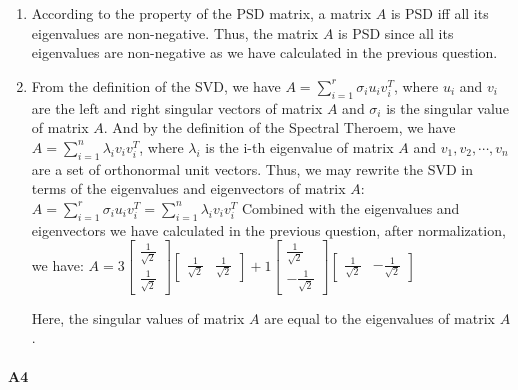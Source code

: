 \documentclass[11pt]{article}
\begin{document}
{{\begin{enumerate}
            \item According to the property of the PSD matrix, a matrix $A$ is PSD iff all its eigenvalues are non-negative. 
            Thus, the matrix $A$ is PSD since all its eigenvalues are non-negative as we have calculated in the previous question.
            \item From the definition of the SVD, we have $A=\sum_{i=1}^r\sigma_iu_iv_i^T$, where $u_i$ and $v_i$ are the left and right singular vectors of matrix $A$ and $\sigma_i$ is the singular value of matrix $A$.
            And by the definition of the Spectral Theroem, we have $A=\sum_{i=1}^n\lambda_iv_iv_i^T$, where $\lambda_i$ is the i-th eigenvalue of matrix $A$ and $v_1, v_2, \cdots, v_n$ are a set of orthonormal unit vectors.
            Thus, we may rewrite the SVD in terms of the eigenvalues and eigenvectors of matrix $A$:
            $
                A = \sum_{i=1}^r\sigma_iu_iv_i^T = \sum_{i=1}^n\lambda_iv_iv_i^T
            $
            Combined with the eigenvalues and eigenvectors we have calculated in the previous question, after normalization, we have:
            $
                A = 3\begin{bmatrix}
                    \frac{1}{\sqrt{2}}\\\frac{1}{\sqrt{2}}
                \end{bmatrix}
                \begin{bmatrix}
                \frac{1}{\sqrt{2}} & \frac{1}{\sqrt{2}}
                \end{bmatrix} + 1\begin{bmatrix}
                    \frac{1}{\sqrt{2}}\\-\frac{1}{\sqrt{2}}
                \end{bmatrix}
                \begin{bmatrix}
                    \frac{1}{\sqrt{2}} & -\frac{1}{\sqrt{2}}
                \end{bmatrix}
            $
            
            Here, the singular values of matrix $A$ are equal to the eigenvalues of matrix $A$.
        \end{enumerate}
    }%
}

\paragraph{A4}~
\end{document}
